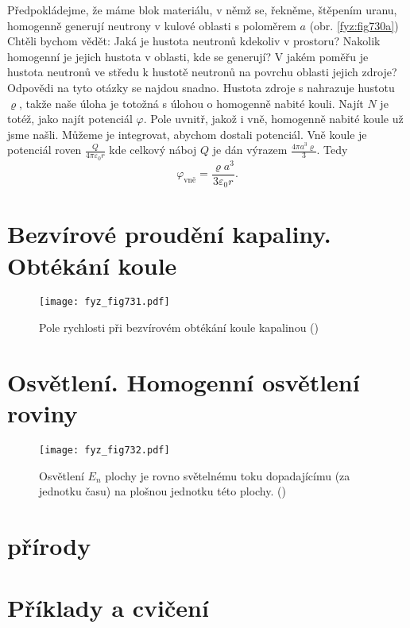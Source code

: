     Předpokládejme, že máme blok materiálu, v němž se, řekněme, štěpením uranu, homogenně generují
    neutrony v kulové oblasti s poloměrem \(a\) (obr. \ref{fyz:fig730a}) Chtěli bychom vědět: Jaká
    je hustota neutronů kdekoliv v prostoru? Nakolik homogenní je jejich hustota v oblasti, kde se
    generují? V jakém poměřu je hustota neutronů ve středu k hustotě neutronů na povrchu oblasti
    jejich zdroje? Odpovědi na tyto otázky se najdou snadno. Hustota zdroje s nahrazuje hustotu
    \(\varrho\), takže naše úloha je totožná s úlohou o homogenně nabité kouli. Najít \(N\) je
    totéž, jako najít potenciál \(\varphi\). Pole uvnitř, jakož i vně, homogenně nabité koule už
    jsme našli. Můžeme je integrovat, aby­chom dostali potenciál. Vně koule je potenciál roven
    \(\frac{Q}{4\pi\varepsilon_0r}\) kde celkový náboj \(Q\) je dán výrazem \(\frac{4\pi
    a^3\varrho}{3}\). Tedy
    \begin{equation}\label{fyz:eq778}
      \varphi_{\text{vně}} = \dfrac{\varrho a^3}{3\varepsilon_0r}.
    \end{equation} 

  \section{Bezvírové proudění kapaliny. Obtékání koule}\label{fyz:IIchapXIIsecV}

    \begin{figure}[ht!] %
      \centering
      \texttt{[image: fyz\_fig731.pdf]}
      \caption{Pole rychlosti při bezvírovém obtékání koule kapalinou
              (\cite[s.~217]{Feynman02})}
      \label{fyz:fig731}
    \end{figure}

  \section{Osvětlení. Homogenní osvětlení roviny}\label{fyz:IIchapXIIsecVI}

    \begin{figure}[ht!] %
      \centering
      \texttt{[image: fyz\_fig732.pdf]}
      \caption{Osvětlení \(E_n\) plochy je rovno světelnému toku dopadajícímu (za jednotku času) na
        plošnou jednotku této plochy. (\cite[s.~220]{Feynman02})}
      \label{fyz:fig732}
    \end{figure}

  \section{ přírody}\label{fyz:IIchapXIIsecVII}



  \section{Příklady a cvičení}\label{fyz:IIchapXIIsecVIII}















